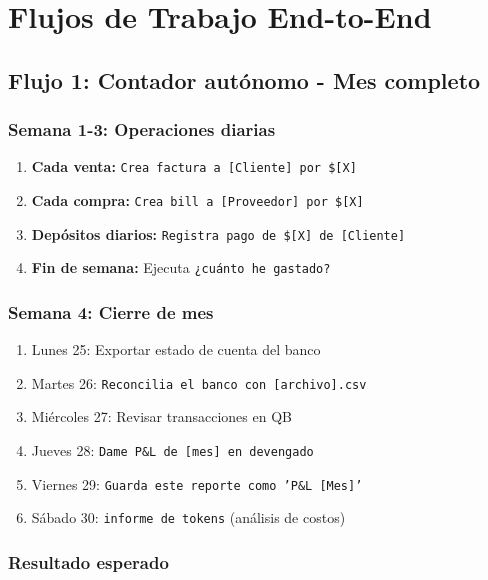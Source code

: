 \documentclass[12pt,oneside]{article}
\begin{document}
\section{Flujos de Trabajo End-to-End}

\subsection{Flujo 1: Contador autónomo - Mes completo}

\subsubsection{Semana 1-3: Operaciones diarias}

\begin{enumerate}
    \item \textbf{Cada venta:} \texttt{Crea factura a [Cliente] por \$[X]}
    \item \textbf{Cada compra:} \texttt{Crea bill a [Proveedor] por \$[X]}
    \item \textbf{Depósitos diarios:} \texttt{Registra pago de \$[X] de [Cliente]}
    \item \textbf{Fin de semana:} Ejecuta \texttt{¿cuánto he gastado?}
\end{enumerate}

\subsubsection{Semana 4: Cierre de mes}

\begin{enumerate}
    \item Lunes 25: Exportar estado de cuenta del banco
    \item Martes 26: \texttt{Reconcilia el banco con [archivo].csv}
    \item Miércoles 27: Revisar transacciones en QB
    \item Jueves 28: \texttt{Dame P\&L de [mes] en devengado}
    \item Viernes 29: \texttt{Guarda este reporte como 'P\&L [Mes]'}
    \item Sábado 30: \texttt{informe de tokens} (análisis de costos)
\end{enumerate}

\subsubsection{Resultado esperado}
\end{document}
